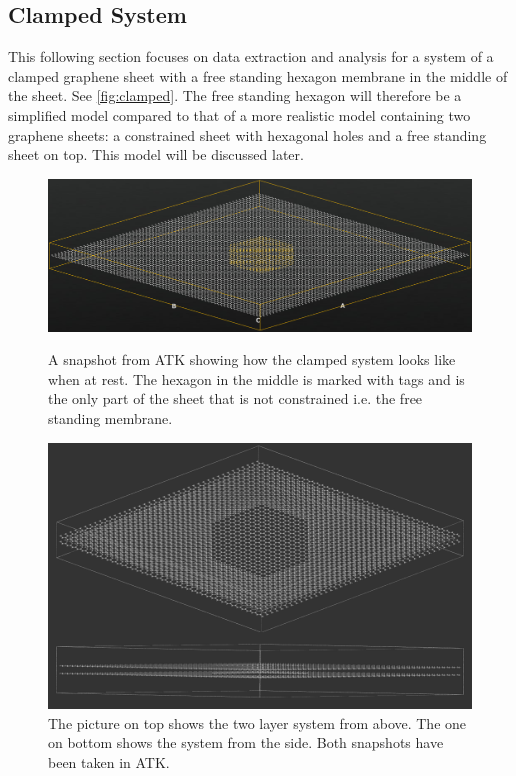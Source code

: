 
\subsection{Clamped System}
This following section focuses on data extraction and analysis for a system of a clamped graphene sheet with a free standing hexagon membrane in the middle of the sheet. See \cref{fig:clamped}. The free standing hexagon will therefore be a simplified model compared to that of a more realistic model containing two graphene sheets: a constrained sheet with hexagonal holes and a free standing sheet on top. This model will be discussed later.
\onecolumngrid

\begin{figure}[H]
    \centering
    \includegraphics[width=\columnwidth]{Figures/NanoLayer5nm.png}
    \caption{A snapshot from ATK\cite{QuantumWise} showing how the clamped system looks like when at rest. The hexagon in the middle is marked with tags and is the only part of the sheet that is not constrained i.e. the free standing membrane.}
    \label{fig:clamped}

\vspace{0em}

    \centering
    \includegraphics[width=\columnwidth]{Figures/DoubleMembrane.png}
\caption{The picture on top shows the two layer system from above. The one on bottom shows the system from the side. Both snapshots have been taken in ATK\cite{QuantumWise}.}
\label{interlayersys}
\end{figure}
\clearpage
\twocolumngrid

